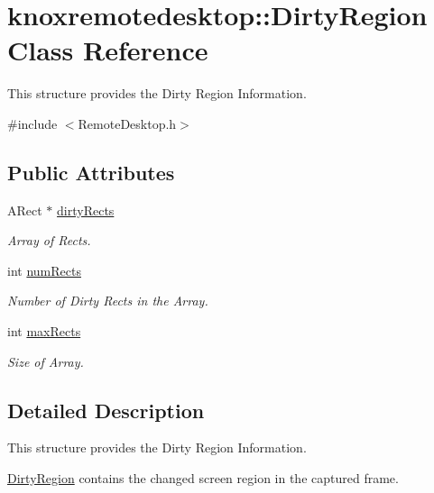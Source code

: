 \hypertarget{classknoxremotedesktop_1_1DirtyRegion}{\section{knoxremotedesktop\-:\-:\-Dirty\-Region \-Class \-Reference}
\label{classknoxremotedesktop_1_1DirtyRegion}
}


\-This structure provides the \-Dirty \-Region \-Information.  




{\ttfamily \#include $<$\-Remote\-Desktop.\-h$>$}

\subsection*{\-Public \-Attributes}
\begin{DoxyCompactItemize}
\item 
\-A\-Rect $\ast$ \hyperlink{classknoxremotedesktop_1_1DirtyRegion_a46d58ad2c718f79613f9ad1b02d64c3d}{dirty\-Rects}
\begin{DoxyCompactList}\small\item\em \-Array of \-Rects. \end{DoxyCompactList}\item 
int \hyperlink{classknoxremotedesktop_1_1DirtyRegion_a433b848a889223e6b404cec9e8db0c7d}{num\-Rects}
\begin{DoxyCompactList}\small\item\em \-Number of \-Dirty \-Rects in the \-Array. \end{DoxyCompactList}\item 
int \hyperlink{classknoxremotedesktop_1_1DirtyRegion_a65b638db44b5b39191e0d72123d9ccc8}{max\-Rects}
\begin{DoxyCompactList}\small\item\em \-Size of \-Array. \end{DoxyCompactList}\end{DoxyCompactItemize}


\subsection{\-Detailed \-Description}
\-This structure provides the \-Dirty \-Region \-Information. 

\hyperlink{classknoxremotedesktop_1_1DirtyRegion}{\-Dirty\-Region} contains the changed screen region in the captured frame.

